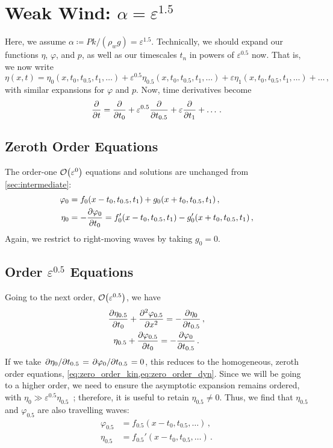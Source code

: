 \documentclass{jfm}
\let\Oldsection\section
\renewcommand{\section}{\FloatBarrier\Oldsection}
\let\Oldsubsection\subsection
\renewcommand{\subsection}{\FloatBarrier\Oldsubsection}
\renewcommand*{\epsilon}{\varepsilon}
\begin{document}
\section{\texorpdfstring{Weak Wind: $\alpha = \epsilon^{1.5}$}{Weak
Wind} \label{sec:weak}}
Here, we assume $\alpha \coloneqq P k/(\rho_w g) = \epsilon^{1.5}$.
Technically, we should expand our functions $\eta$, $\varphi$, and $p$,
as well as our timescales $t_n$ in powers of $\epsilon^{0.5}$ now.
That is, we now write
\begin{equation}
  \eta(x,t) = \eta_0(x,t_0,t_{0.5},t_1,\ldots) + \epsilon^{0.5}
  \eta_{0.5}(x,t_0,t_{0.5},t_1,\ldots) + \epsilon
  \eta_1(x,t_0,t_{0.5},t_1,\ldots) + \ldots \,,
\end{equation}
with similar expansions for $\varphi$ and $p$.
Now, time derivatives become
\begin{equation}
  \pdv{t} = \pdv{t_0} + \epsilon^{0.5} \pdv{t_{0.5}} + \epsilon
  \pdv{t_1} + \ldots \,.
\end{equation}

\subsection{Zeroth Order Equations}
The order-one $\order{\epsilon^0}$ equations and solutions are unchanged
from \cref{sec:intermediate}:
\begin{align}
  \varphi_0 &= f_0(x-t_0,t_{0.5},t_1) + g_0(x+t_0,t_{0.5},t_1) \,, \\
  \eta_0 &= - \pdv{\varphi_0}{t_0} = f_0'(x-t_0,t_{0.5},t_1) -
    g_0'(x+t_0,t_{0.5},t_1) \,,
\end{align}
Again, we restrict to right-moving waves by taking $g_0=0$.

\subsection{Order \texorpdfstring{$\epsilon^{0.5}$}{0.5} Equations}
Going to the next order, $\order{\epsilon^{0.5}}$, we have
\begin{gather}
  \pdv{\eta_{0.5}}{t_0} + \pdv[2]{\varphi_{0.5}}{x} =
  -\pdv{\eta_0}{t_{0.5}} \,, \\
  \eta_{0.5} + \pdv{\varphi_{0.5}}{t_0} = -\pdv{\varphi_0}{t_{0.5}}\,.
\end{gather}
If we take $\pdv*{\eta_0}{t_{0.5}} = \pdv*{\varphi_0}{t_{0.5}} = 0$,
this reduces to the homogeneous, zeroth order equations,
\cref{eq:zero_order_kin,eq:zero_order_dyn}.
Since we will be going to a higher order, we need to ensure the
asymptotic expansion remains ordered, with $\eta_0 \gg \epsilon^{0.5}
\eta_{0.5}$~\citep{ott1969nonlinear}; therefore, it is useful to
retain $\eta_{0.5} \neq 0$.
Thus, we find that $\eta_{0.5}$ and $\varphi_{0.5}$ are also travelling
waves:
\begin{align}
  \varphi_{0.5} &= f_{0.5}(x-t_0,t_{0.5},\ldots) \,,
    \label{eq:phi0.5_sol} \\
  \eta_{0.5} &= f_{0.5}'(x-t_0,t_{0.5},\ldots) \,.
    \label{eq:eta0.5_sol}
\end{align}
\end{document}
